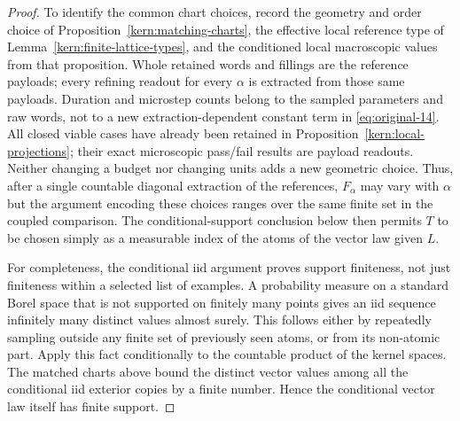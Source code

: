\begin{proof}
To identify the common chart choices, record the geometry and order choice of
Proposition~\ref{kern:matching-charts}, the effective local reference type of
Lemma~\ref{kern:finite-lattice-types}, and the conditioned local macroscopic values from that
proposition. Whole retained words and fillings are the reference payloads; every refining
readout for every \(\alpha\) is extracted from those same payloads. Duration and microstep
counts belong to the sampled parameters and raw words, not to a new extraction-dependent
constant term in \eqref{eq:original-14}. All closed viable cases have already been retained in
Proposition~\ref{kern:local-projections}; their exact microscopic pass/fail results are payload
readouts. Neither changing a budget nor changing units adds a new geometric choice. Thus, after
a single countable diagonal extraction of the references, \(F_\alpha\) may vary with \(\alpha\)
but the argument encoding these choices ranges over the same finite set in the coupled
comparison. The conditional-support conclusion below then permits \(T\) to be chosen simply
as a measurable index of the atoms of the vector law given \(L\).

For completeness, the conditional iid argument proves support finiteness, not just finiteness
within a selected list of examples. A probability measure on a standard Borel space that is not
supported on finitely many points gives an iid sequence infinitely many distinct values almost
surely. This follows either by repeatedly sampling outside any finite set of previously seen
atoms, or from its non-atomic part. Apply this fact conditionally to the countable product of the
kernel spaces. The matched charts above bound the distinct vector values among all the
conditional iid exterior copies by a finite number. Hence the conditional vector law itself
has finite support.

\end{proof}

